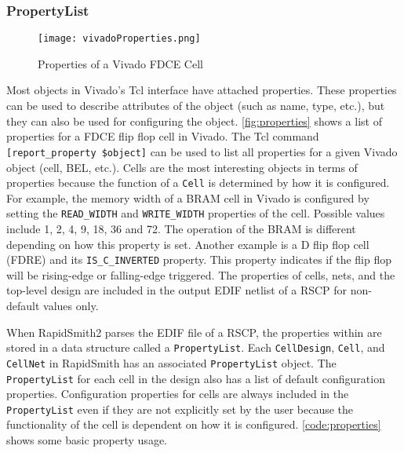 \subsubsection {PropertyList}

\begin{figure}[b!]
 \centering
 \texttt{[image: vivadoProperties.png]}
 \caption{Properties of a Vivado FDCE Cell}
 \label{fig:properties}
\end{figure}


Most objects in Vivado's Tcl interface have attached properties. These
properties can be used to describe attributes of the object (such as name,
type, etc.), but they can also be used for configuring the object.
\autoref{fig:properties} shows a list of properties for a FDCE flip flop
cell in Vivado. The Tcl command \texttt{[report\_property \$object]} can be used to
list all properties for a given Vivado object (cell, BEL, etc.). Cells
are the most interesting objects in terms of properties because the function
of a \texttt{Cell} is determined by how it is configured. For example, the
memory width of a BRAM cell in Vivado is configured by setting the
\texttt{READ\_WIDTH} and \texttt{WRITE\_WIDTH} properties of the cell. Possible
values include 1, 2, 4, 9, 18, 36 and 72. The operation of the BRAM is different
depending on how this property is set. Another example is a D flip flop cell
(FDRE) and its \texttt{IS\_C\_INVERTED} property. This property indicates if
the flip flop will be rising-edge or falling-edge triggered. The properties of
cells, nets, and the top-level design are included in the output EDIF netlist
of a RSCP for non-default values only.

When RapidSmith2 parses the EDIF file of a RSCP, the properties
within are stored in a data structure called a \texttt{PropertyList}. Each
\texttt{CellDesign}, \texttt{Cell}, and \texttt{CellNet} in RapidSmith has an
associated \texttt{PropertyList} object. The \texttt{PropertyList} for each
cell in the design also has a list of default configuration properties.
Configuration properties for cells are always included in the
\texttt{PropertyList} even if they are not explicitly set by the user because
the functionality of the cell is dependent on how it is configured.
\autoref{code:properties} shows some basic property usage.

